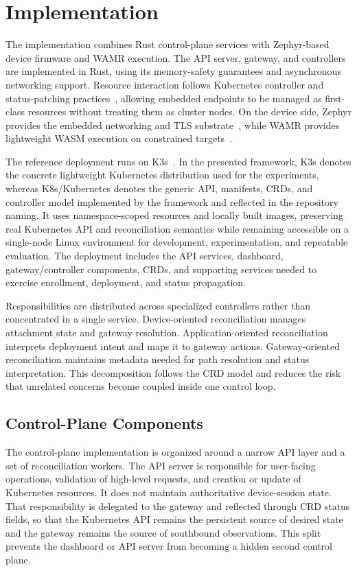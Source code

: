 \section{Implementation}\label{sec:implementation}

The implementation combines Rust control-plane services with Zephyr-based device firmware and WAMR execution. The API server, gateway, and controllers are implemented in Rust, using its memory-safety guarantees and asynchronous networking support. Resource interaction follows Kubernetes controller and status-patching practices~\cite{kubernetes,kubernetes_operators}, allowing embedded endpoints to be managed as first-class resources without treating them as cluster nodes. On the device side, Zephyr provides the embedded networking and TLS substrate~\cite{zephyr}, while WAMR provides lightweight WASM execution on constrained targets~\cite{wamr}.

The reference deployment runs on K3s~\cite{k3s}. {\color{red}In the presented framework, K3s denotes the concrete lightweight Kubernetes distribution used for the experiments, whereas K8s/Kubernetes denotes the generic API, manifests, CRDs, and controller model implemented by the framework and reflected in the repository naming.} It uses namespace-scoped resources and locally built images, preserving real Kubernetes API and reconciliation semantics while remaining accessible on a single-node Linux environment for development, experimentation, and repeatable evaluation. The deployment includes the API services, dashboard, gateway/controller components, CRDs, and supporting services needed to exercise enrollment, deployment, and status propagation.

Responsibilities are distributed across specialized controllers rather than concentrated in a single service. Device-oriented reconciliation manages attachment state and gateway resolution. Application-oriented reconciliation interprets deployment intent and maps it to gateway actions. Gateway-oriented reconciliation maintains metadata needed for path resolution and status interpretation. This decomposition follows the CRD model and reduces the risk that unrelated concerns become coupled inside one control loop.

\begingroup
\color{red}
\subsection{Control-Plane Components}
The control-plane implementation is organized around a narrow API layer and a set of reconciliation workers. The API server is responsible for user-facing operations, validation of high-level requests, and creation or update of Kubernetes resources. It does not maintain authoritative device-session state. That responsibility is delegated to the gateway and reflected through CRD status fields, so that the Kubernetes API remains the persistent source of desired state and the gateway remains the source of southbound observations. This split prevents the dashboard or API server from becoming a hidden second control plane.

